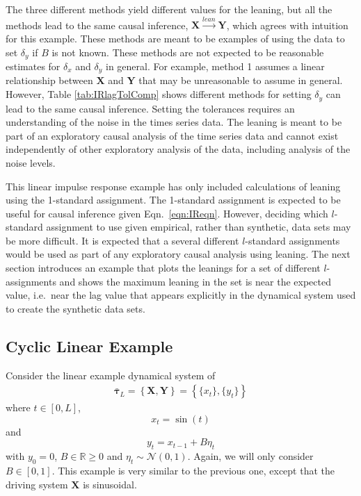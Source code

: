 \documentclass[a4paper,11pt,twocolumn]{article}
\begin{document}
The three different methods yield different values for the leaning, but all the methods lead to the same causal inference, $\mathbf{X}\xrightarrow{lean}\mathbf{Y}$, which agrees with intuition for this example.  These methods are meant to be examples of using the data to set $\delta_y$ if $B$ is not known.  These methods are not expected to be reasonable estimates for $\delta_x$ and $\delta_y$ in general.  For example, method 1 assumes a linear relationship between $\mathbf{X}$ and $\mathbf{Y}$ that may be unreasonable to assume in general.  However, Table \ref{tab:IRlagTolComp} shows different methods for setting $\delta_y$ can lead to the same causal inference.  Setting the tolerances requires an understanding of the noise in the times series data.  The leaning is meant to be part of an exploratory causal analysis of the time series data and cannot exist independently of other exploratory analysis of the data, including analysis of the noise levels.  

This linear impulse response example has only included calculations of leaning using the 1-standard assignment.  The 1-standard assignment is expected to be useful for causal inference given Eqn.\ \ref{eqn:IReqn}.  However, deciding which $l$-standard assignment to use given empirical, rather than synthetic, data sets may be more difficult.  It is expected that a several different $l$-standard assignments would be used as part of any exploratory causal analysis using leaning.  The next section introduces an example that plots the leanings for a set of different $l$-assignments and shows the maximum leaning in the set is near the expected value, i.e.\ near the lag value that appears explicitly in the dynamical system used to create the synthetic data sets.

\subsection{Cyclic Linear Example}
Consider the linear example dynamical system of
\begin{eqnarray}
\label{eqn:cyceqn}
\bar{\mathbf{\tau}}_L = \left\{\mathbf{X},\mathbf{Y}\right\} = \left\{\{x_t\},\{y_t\}\right\}
\end{eqnarray}
where $t\in[0,L]$,
\begin{equation*}
x_t = \sin(t)
\end{equation*}
and
\begin{equation*}
y_t = x_{t-1} + B\eta_t
\end{equation*}
with $y_0 = 0$, $B\in\mathbb{R}\ge 0$ and $\eta_t\sim\mathcal{N}\left(0,1\right)$.  Again, we will only consider $B\in[0,1]$.  This example is very similar to the previous one, except that the driving system $\mathbf{X}$ is sinusoidal.
\end{document}
